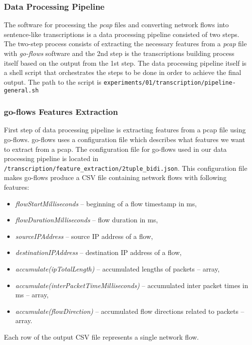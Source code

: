 \documentclass{article}
\begin{document}
\subsubsection{Data Processing Pipeline}
The software for processing the \textit{pcap} files and converting network flows into sentence-like transcriptions is a data processing pipeline consisted of two steps. The two-step process consists of extracting the necessary features from a \textit{pcap} file with \textit{go-flows} software \cite{goflows-reference} and the 2nd step is the transcriptions building process itself based on the output from the 1st step. The data processing pipeline itself is a shell script that orchestrates the steps to be done in order to achieve the final output. The path to the script is \verb|experiments/01/transcription/pipeline-general.sh|


\subsubsection{go-flows Features Extraction}\label{sec:go-flows-feature-extraction}
First step of data processing pipeline is extracting features from a pcap file using go-flows. go-flows uses a configuration file which describes what features we want to extract from a pcap. The configuration file for go-flows used in our data processing pipeline is located in \verb|/transcription/feature_extraction/2tuple_bidi.json|. This configuration file makes go-flows produce a CSV file containing network flows with following features:

\begin{itemize}
    \item \textit{flowStartMilliseconds} -- beginning of a flow timestamp in ms,
    \item \textit{flowDurationMilliseconds} -- flow duration in ms,
    \item \textit{sourceIPAddress} -- source IP address of a flow,
    \item \textit{destinationIPAddress} -- destination IP address of a flow,
    \item \textit{accumulate(ipTotalLength)} -- accumulated lengths of packets -- array,
    \item \textit{accumulate(\textunderscore interPacketTimeMilliseconds)} -- accumulated inter packet times in ms -- array,
    \item \textit{accumulate(flowDirection)} -- accumulated flow directions related to packets -- array.
\end{itemize}
Each row of the output CSV file represents a single network flow.
\end{document}
